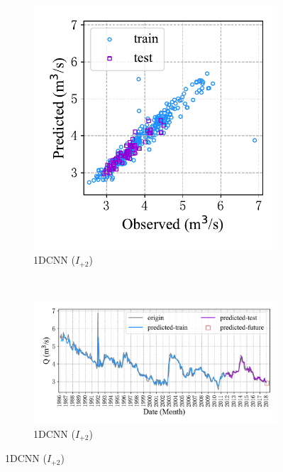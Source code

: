 \begin{figure}[!htbp]
\begin{subfigure}[b]{0.615\textwidth}
  \end{subfigure}
  \\
  \begin{subfigure}[b]{0.305\textwidth}
    \includegraphics[width=\textwidth]{Img/chap4_spr/out1/spr_scatter_in_2_out_1_cnn.pdf}
    \vspace{-1.2cm}
    \caption{1DCNN ($I_{+2}$)}
    \label{fig:spr_scatter_in_2_out_1_cnn}
  \end{subfigure}
  ~
  \begin{subfigure}[b]{0.615\textwidth}
    \includegraphics[width=\textwidth]{Img/chap4_spr/out1/spr_series_in_2_out_1_cnn.pdf}
    \vspace{-1.2cm}
    \caption{1DCNN ($I_{+2}$)}
    \label{fig:spr_series_in_2_out_1_cnn}

\end{subfigure}
\end{figure}
